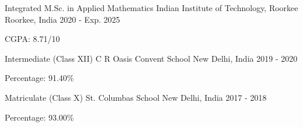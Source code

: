 

\begin{cventries}

  \cventry
    {Integrated M.Sc. in Applied Mathematics} %
    {Indian Institute of Technology, Roorkee} %
    {Roorkee, India} %
    {2020 - Exp. 2025} %
    {
      \begin{cvitems} %
        \item {CGPA: 8.71/10}
      \end{cvitems}
    }

	\cventry
		{Intermediate (Class XII)} %
		{C R Oasis Convent School} %
		{New Delhi, India} %
		{2019 - 2020} %
		{
			\begin{cvitems} %
				\item {Percentage: 91.40\%}
			\end{cvitems}
		}

	\cventry
		{Matriculate (Class X)} %
		{St. Columbas School} %
		{New Delhi, India} %
		{2017 - 2018} %
		{
			\begin{cvitems} %
				\item {Percentage: 93.00\%}
			\end{cvitems}
		}

\end{cventries}
